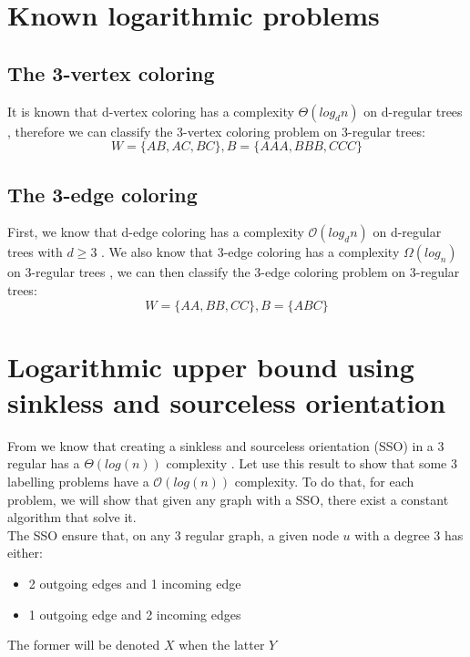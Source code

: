 
\section{Known logarithmic problems}
\subsection{The 3-vertex coloring}
It is known that d-vertex coloring has a complexity $\Theta(log_dn)$ on d-regular trees \cite{DBLP:journals/corr/ChangKP16}, therefore we can classify the 3-vertex coloring problem on 3-regular trees: $$W = \{AB, AC, BC\}, B =\{AAA,BBB,CCC\}$$


\subsection{The 3-edge coloring}
First, we know that d-edge coloring has a complexity $\mathcal{O}(log_dn)$  on d-regular trees with $d\geq 3$ \cite{DBLP:journals/corr/abs-1708-04290}.
We also know that 3-edge coloring has a complexity $\Omega(log_n)$ on 3-regular trees \cite{balliu2019locality}, we can then classify the 3-edge coloring problem on 3-regular trees: $$W = \{AA, BB, CC\}, B=\{ABC\}$$


\section{Logarithmic upper bound using sinkless and sourceless orientation}
From \cite{1} we know that creating a sinkless and sourceless orientation (SSO) in a 3 regular has a $\Theta(log(n))$ complexity \cite{1}. Let use this result to show that some 3 labelling problems have a $\mathcal{O}(log(n))$ complexity. To do that, for each problem, we will show that given any graph with a SSO, there exist a constant algorithm that solve it.\\
The SSO ensure that, on any 3 regular graph, a given node $u$ with a degree 3 has either:
\begin{itemize}
    \item 2 outgoing edges and 1 incoming edge
    \item 1 outgoing edge and 2 incoming edges
\end{itemize}
The former will be denoted $X$ when the latter $Y$
